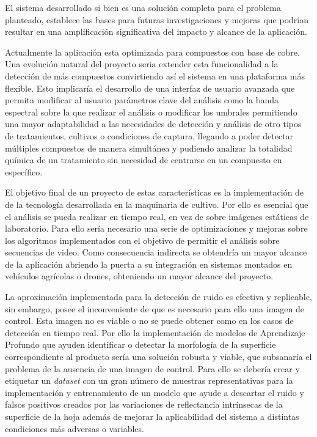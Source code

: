 El sistema desarrollado si bien es una solución completa para el problema planteado, establece las bases para futuras investigaciones y mejoras que podrían resultar en una amplificación significativa del impacto y alcance de la aplicación.

Actualmente la aplicación esta optimizada para compuestos con base de cobre. Una evolución natural del proyecto seria extender esta funcionalidad a la detección de más compuestos convirtiendo así el sistema en una plataforma más flexible. Esto implicaría el desarrollo de una interfaz de usuario avanzada que permita modificar al usuario parámetros clave del análisis como la banda espectral sobre la que realizar el análisis o modificar los umbrales permitiendo una mayor adaptabilidad a las necesidades de detección y análisis de otro tipos de tratamientos, cultivos o condiciones de captura, llegando a poder detectar múltiples compuestos de manera simultánea y pudiendo analizar la totalidad química de un tratamiento sin necesidad de centrarse en un compuesto en específico.

El objetivo final de un proyecto de estas características  es la implementación de de la tecnología desarrollada en la maquinaria de cultivo. Por ello es esencial que el análisis se pueda realizar en tiempo real, en vez de sobre imágenes estáticas de laboratorio. Para ello sería necesario una serie de optimizaciones y mejoras sobre los algoritmos implementados con el objetivo de permitir el análisis sobre secuencias de video. Como consecuencia indirecta se obtendría un mayor alcance de la aplicación abriendo la puerta a su integración en sistemas montados en vehículos agrícolas o drones, obteniendo un mayor alcance del proyecto.

La aproximación implementada para la detección de ruido es efectiva y replicable, sin embargo, posee el inconveniente de que es necesario para ello una imagen de control. Esta imagen no es viable o no se puede obtener como en los casos de detección en tiempo real. Por ello la implementación de modelos de Aprendizaje Profundo que ayuden  identificar o detectar la morfología de la superficie correspondiente al producto sería una solución robusta y viable, que subsanaría el problema de la ausencia de una imagen de control. Para ello se debería crear y etiquetar un \textit{dataset} con un gran número de muestras representativas para la implementación y entrenamiento de un modelo que ayude a descartar el ruido y falsos positivos creados por las variaciones de reflectancia intrínsecas de la superficie de la hoja además de mejorar la aplicabilidad del sistema a distintas condiciones más adversas o variables.



